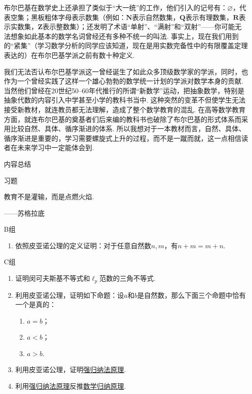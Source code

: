 布尔巴基在数学史上还承担了类似于``大一统''的工作，他们引入的记号有：$\varnothing$，代表空集；黑板粗体字母表示数集（例如：$\mathbf{N}$表示自然数集，$\mathbf{Q}$表示有理数集，$\mathbf{R}$表示实数集，$\mathbf{Z}$表示整数集）；还发明了术语``单射''、``满射''和``双射''——你可能无法想象如此基本的数学名词曾经还有多种不统一的叫法. 事实上，现在我们用到的``紧集''（学习数学分析的同学应该知道，现在是用实数完备性中的有限覆盖定理表达的）在布尔巴基学派之前有数十种定义.

我们无法否认布尔巴基学派这一曾经诞生了如此众多顶级数学家的学派，同时，也作为一个曾经实践了这样一个雄心勃勃的数学统一计划的学派对数学本身的贡献. 当然他们曾经在20世纪50--60年代推行的所谓``新数学''运动，把抽象数学，特别是抽象代数的内容引入中学甚至小学的教科书当中. 这种突然的变革不但使学生无法接受新教材，就连教员都无法理解，造成了整个数学教育的混乱. 在高等数学教育方面，就连布尔巴基的奠基者们后来编的教科书也破除了布尔巴基的形式体系而采用比较自然、具体、循序渐进的体系. 所以我想对于一本教材而言，自然、具体、循序渐进是重要的，学习需要螺旋式上升的过程，而不是一蹴而就，这一点相信读者在未来学习中一定能体会到.

\vspace{2ex}
\centerline{\heiti \Large 内容总结}

\vspace{2ex}
\centerline{\heiti \Large 习题}

\vspace{2ex}
{\kaishu 教育不是灌输，而是点燃火焰.}
\begin{flushright}
    \kaishu
    ——苏格拉底
\end{flushright}

\centerline{\heiti B组}
\begin{enumerate}
    \item 依照皮亚诺公理的定义证明：对于任意自然数$n,m$，有$n+m=m+n$.
\end{enumerate}

\centerline{\heiti C组}
\begin{enumerate}
    \item 证明闵可夫斯基不等式和$\ell_p$范数的三角不等式.

    \item 利用皮亚诺公理，证明如下命题：设$a$和$b$是自然数，那么下面三个命题中恰有一个是真的：
          \begin{enumerate}
              \item $a=b$；

              \item $a<b$；

              \item $a>b$.
          \end{enumerate}

    \item 利用皮亚诺公理，证明\hyperref[thm:1e:强归纳法原理]{强归纳法原理}.

    \item 利用\hyperref[thm:1e:强归纳法原理]{强归纳法原理}反推\hyperref[thm:1e:数学归纳原理]{数学归纳原理}.
\end{enumerate}
